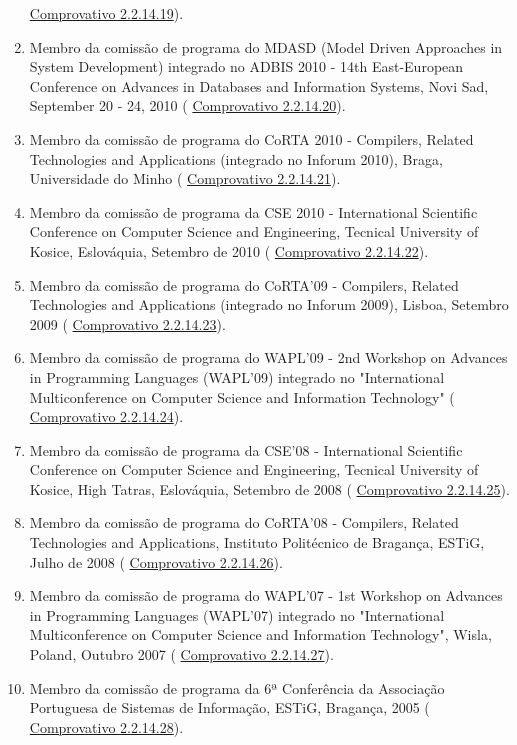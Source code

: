 \documentclass[11pt]{article}
\begin{document}
\begin{enumerate}
{\href{run:ComprovativosCOCP/CPWAPL2011.pdf}{Comprovativo 2.2.14.19}).}
\item{Membro da comissão de programa do MDASD (Model Driven Approaches in System Development) integrado no ADBIS 2010 - 14th East-European Conference on Advances in Databases and Information Systems, Novi Sad, September 20 - 24, 2010 (
\href{run:ComprovativosCOCP/CPMDASD2010.pdf}{Comprovativo 2.2.14.20}).}
\item{Membro da comissão de programa do CoRTA 2010 - Compilers, Related Technologies and Applications (integrado no Inforum 2010), Braga, Universidade do Minho (
\href{run:ComprovativosCOCP/CPCoRTA2010.pdf}{Comprovativo 2.2.14.21}).}
\item{Membro da comissão de programa da CSE 2010 - International Scientific Conference on Computer Science and Engineering, Tecnical University of Kosice, Eslováquia, Setembro de 2010 (
\href{run:ComprovativosCOCP/CPCSE2010.pdf}{Comprovativo 2.2.14.22}).}
\item{Membro da comissão de programa do CoRTA'09 - Compilers, Related Technologies and Applications (integrado no Inforum 2009), Lisboa, Setembro 2009 (
\href{run:ComprovativosCOCP/CPCoRTA2009.pdf}{Comprovativo 2.2.14.23}).}
\item{Membro da comissão de programa do WAPL'09 - 2nd Workshop on Advances in Programming Languages (WAPL'09) integrado no "International Multiconference on Computer Science and Information Technology" (
\href{run:ComprovativosCOCP/CPWAPL09.pdf}{Comprovativo 2.2.14.24}).}
\item{Membro da comissão de programa da CSE'08 - International Scientific Conference on Computer Science and Engineering, Tecnical University of Kosice, High Tatras, Eslováquia, Setembro de 2008 (
\href{run:ComprovativosCOCP/CPCSE2008.pdf}{Comprovativo 2.2.14.25}).}
\item{Membro da comissão de programa do CoRTA'08 - Compilers, Related Technologies and Applications, Instituto Politécnico de Bragança, ESTiG, Julho de 2008 (
\href{run:ComprovativosCOCP/COCPCoRTA08.pdf}{Comprovativo 2.2.14.26}).}
\item{Membro da comissão de programa do WAPL'07 - 1st Workshop on Advances in Programming Languages (WAPL'07) integrado no "International Multiconference on Computer Science and Information Technology", Wisla, Poland, Outubro 2007 (
\href{run:ComprovativosCOCP/CPWAPL07.pdf}{Comprovativo 2.2.14.27}).}
\item{Membro da comissão de programa da 6ª Conferência da Associação Portuguesa de Sistemas de Informação, ESTiG, Bragança, 2005 (
\href{run:ComprovativosCOCP/CPAPSI05.pdf}{Comprovativo 2.2.14.28}).}
\end{enumerate}
\end{document}
